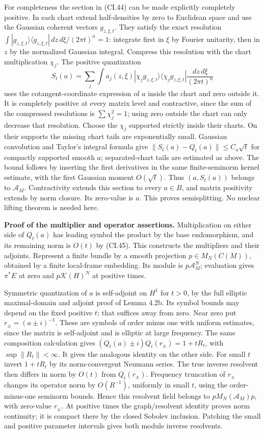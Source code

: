 \documentclass[
  11pt,
]{article}
\begin{document}
For completeness the section in (CI.44) can be made explicitly
completely positive. In each chart extend half-densities by zero to
Euclidean space and use the Gaussian coherent vectors \(g_{z,\xi,t}\).
They satisfy the exact resolution
\(\int|g_{z,\xi,t}\rangle\langle g_{z,\xi,t}|\,dz\,d\xi/(2\pi t)^n=1\):
integrate first in \(\xi\) by Fourier unitarity, then in \(z\) by the
normalized Gaussian integral. Compress this resolution with the chart
multiplication \(\chi_j\). The positive quantization \[
 S_t(a)=\sum_j\int a_j(z,\xi)
 |\chi_jg_{z,\xi,t}\rangle\langle\chi_jg_{z,\xi,t}|
                         \frac{dz\,d\xi}{(2\pi t)^n}
\] uses the cotangent-coordinate expression of \(a\) inside the chart
and zero outside it. It is completely positive at every matrix level and
contractive, since the sum of the compressed resolutions is
\(\sum\chi_j^2=1\); using zero outside the chart can only decrease that
resolution. Choose the \(\chi_j\) supported strictly inside their
charts. On their supports the missing chart tails are exponentially
small. Gaussian convolution and Taylor's integral formula give
\(\|S_t(a)-Q_t(a)\|\leq C_a\sqrt t\) for compactly supported smooth
\(a\); separated-chart tails are estimated as above. The bound follows
by inserting the first derivatives in the same finite-seminorm kernel
estimate, with the first Gaussian moment \(O(\sqrt t)\). Thus
\((a,S_t(a))\) belongs to \(\mathcal A_M\). Contractivity extends this
section to every \(a\in B\), and matrix positivity extends by norm
closure. Its zero-value is \(a\). This proves semisplitting. No nuclear
lifting theorem is needed here.

\textbf{Proof of the multiplier and operator assertions.} Multiplication
on either side of \(Q_t(a)\) has leading symbol the product by the base
endomorphism, and its remaining norm is \(O(t)\) by (CI.45). This
constructs the multipliers and their adjoints. Represent a finite bundle
by a smooth projection \(p\in M_N(C(M))\), obtained by a finite
local-frame embedding. Its module is \(p\mathcal A_M^N\); evaluation
gives \(\pi^*E\) at zero and \(p\mathcal K(H)^N\) at positive times.

Symmetric quantization of \(a\) is self-adjoint on \(H^1\) for \(t>0\),
by the full elliptic maximal-domain and adjoint proof of Lemma 4.2b. Its
symbol bounds may depend on the fixed positive \(t\); that suffices away
from zero. Near zero put \(r_\pm=(a\pm i)^{-1}\). These are symbols of
order minus one with uniform estimates, since the matrix is self-adjoint
and is elliptic at large frequency. The same composition calculation
gives \((Q_t(a)\pm i)Q_t(r_\pm)=1+tR_t\), with \(\sup\|R_t\|<\infty\).
It gives the analogous identity on the other side. For small \(t\)
invert \(1+tR_t\) by its norm-convergent Neumann series. The true
inverse resolvent then differs in norm by \(O(t)\) from \(Q_t(r_\pm)\).
Frequency truncation of \(r_\pm\) changes its operator norm by
\(O(R^{-1})\), uniformly in small \(t\), using the order-minus-one
seminorm bounds. Hence this resolvent field belongs to
\(pM_N(\mathcal A_M)p\), with zero-value \(r_\pm\). At positive times
the graph/resolvent identity proves norm continuity; it is compact there
by the closed Sobolev inclusion. Patching the small and positive
parameter intervals gives both module inverse resolvents.
\end{document}
